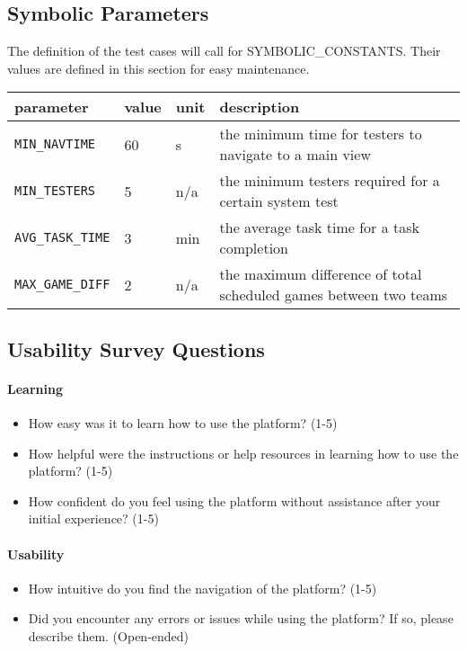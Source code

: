 \documentclass[12pt, titlepage]{article}
\begin{document}
\subsection{Symbolic Parameters}

The definition of the test cases will call for SYMBOLIC\_CONSTANTS.
Their values are defined in this section for easy maintenance.
\begin{longtable}{|l|l|l|p{5cm}|}

  \hline
  parameter                                     & value & unit & description                                                       \\
  \hline
  \texttt{MIN\_NAVTIME}\label{MIN_NAVTIME}      & 60    & s    & the minimum time for testers to navigate to a main view           \\
  \hline
  \texttt{MIN\_TESTERS}\label{MIN_TESTERS}      & 5     & n/a  & the minimum testers required for a certain system test            \\
  \hline
  \texttt{AVG\_TASK\_TIME}\label{AVG_TASK_TIME} & 3     & min  & the average task time for a task completion                       \\
  \hline
  \texttt{MAX\_GAME\_DIFF}\label{MAX_GAME_DIFF} & 2     & n/a  & the maximum difference of total scheduled games between two teams \\
  \hline
\end{longtable}

\subsection{Usability Survey Questions}

\paragraph{Learning}
\begin{itemize}
  \item{How easy was it to learn how to use the platform? (1-5)}
  \item{How helpful were the instructions or help resources in learning how to use the platform? (1-5)}
  \item{How confident do you feel using the platform without assistance after your initial experience? (1-5)}
\end{itemize}

\paragraph{Usability}
\begin{itemize}
  \item{How intuitive do you find the navigation of the platform? (1-5)}
  \item{Did you encounter any errors or issues while using the platform? If so, please describe them. (Open-ended)}
\end{itemize}
\end{document}
